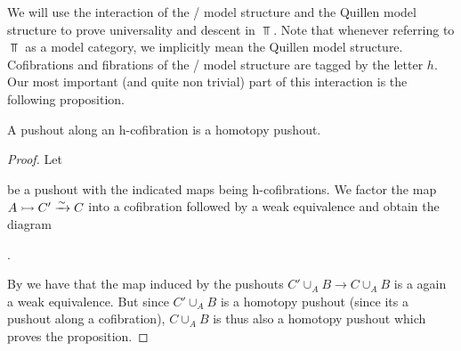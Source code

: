 We will use the interaction of the \Strom/ model structure and the Quillen model structure to prove universality and descent in $\Top$.
Note that whenever referring to $\Top$ as a model category, we implicitly mean the Quillen model structure. 
Cofibrations and fibrations of the \Strom/ model structure are tagged by the letter $h$.
Our most important (and quite non trivial) part of this interaction is the following proposition.
\begin{prop}\label{prop:poAlongHCofibIsHtpyPo}
    A pushout along an h-cofibration is a homotopy pushout.
    \begin{proof}
        Let
        \begin{center}
        \end{center}
        be a pushout with the indicated maps being h-cofibrations.
        We factor the map $A\xtailrightarrow{} C'\xrightarrow{\sim} C$ into a cofibration followed by a weak equivalence and obtain the diagram
        \begin{center}
            \;.
        \end{center}
        By \cite[Proposition 1.1]{hcolim_bar} we have that the map induced by the pushouts $C'\cup_AB\to C\cup_AB$ is a again a weak equivalence.
        But since $C'\cup_AB$ is a homotopy pushout (since its a pushout along a cofibration), $C\cup_AB$ is thus also a homotopy pushout which proves the proposition.
    \end{proof}
\end{prop}
